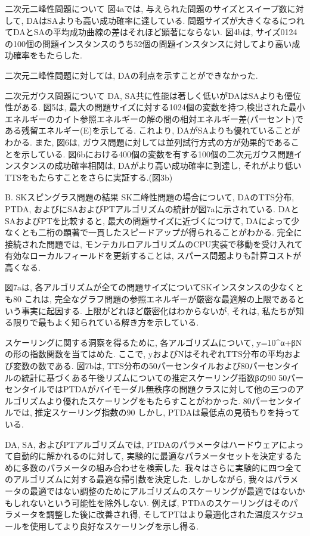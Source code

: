 二次元二峰性問題について
図4aでは, 与えられた問題のサイズとスイープ数に対して, DAはSAよりも高い成功確率に達している. 
問題サイズが大きくなるにつれてDAとSAの平均成功曲線の差はそれほど顕著にならない. 
図4bは, サイズ0124の100個の問題インスタンスのうち52個の問題インスタンスに対してより高い成功確率をもたらした. 

二次元二峰性問題に対しては, DAの利点を示すことができなかった. 

二次元ガウス問題について
DA, SA共に性能は著しく低いがDAはSAよりも優位性がある. 
図5は, 最大の問題サイズに対する1024個の変数を持つ,検出された最小エネルギーのカイト参照エネルギーの解の間の相対エネルギー差(パーセント)である残留エネルギー(E)を示してる. 
これより, DAがSAよりも優れていることがわかる. 
また, 図6は, ガウス問題に対しては並列試行方式の方が効果的であることを示している.
図6bにおける400個の変数を有する100個の二次元ガウス問題インスタンスの成功確率相関は, DAがより高い成功確率に到達し, それがより低いTTSをもたらすことをさらに実証する.(図3b)

B. SKスピングラス問題の結果
SK二峰性問題の場合について, DAのTTS分布, PTDA, およびにSAおよびPTアルゴリズムの統計が図7aに示されている. 
DAとSAおよびPTを比較すると, 最大の問題サイズに近づくにつけて, DAによって少なくとも二桁の顕著で一貫したスピードアップが得られることがわかる. 
完全に接続された問題では, モンテカルロアルゴリズムのCPU実装で移動を受け入れて有効なローカルフィールドを更新することは, スパース問題よりも計算コストが高くなる. 

図7aは, 各アルゴリズムが全ての問題サイズについてSKインスタンスの少なくとも80%
これは, 完全なグラフ問題の参照エネルギーが厳密な最適解の上限であるという事実に起因する. 
上限がどれほど厳密化はわからないが, それは, 私たちが知る限りで最もよく知られている解き方を示している.

スケーリングに関する洞察を得るために, 各アルゴリズムについて, y=10^α+βNの形の指数関数を当てはめた. 
ここで, yおよびNはそれぞれTTS分布の平均および変数の数である. 
図7bは, TTS分布の50パーセンタイルおよび80パーセンタイルの統計に基づくある午後リズムについての推定スケーリング指数βの90%
50パーセンタイルではPTDAがバイモーダル無秩序の問題クラスに対して他の三つのアルゴリズムより優れたスケーリングをもたらすことがわかった. 
80パーセンタイルでは, 推定スケーリング指数の90%
しかし, PTDAは最低点の見積もりを持っている. 

DA, SA, およびPTアルゴリズムでは, PTDAのパラメータはハードウェアによって自動的に解かれるのに対して, 実験的に最適なパラメータセットを決定するために多数のパラメータの組み合わせを検索した. 
我々はさらに実験的に四つ全てのアルゴリズムに対する最適な掃引数を決定した. 
しかしながら, 我々はパラメータの最適ではない調整のためにアルゴリズムのスケーリングが最適ではないかもしれないという可能性を除外しない. 
例えば, PTDAのスケーリングはそのパラメータを調整した後に改善され得, そしてPTはより最適化された温度スケジュールを使用してより良好なスケーリングを示し得る. 

